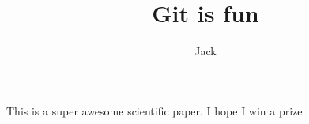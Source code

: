 \documentclass[10pt]{article}
\author{Jack}
\title{Git is fun}
\begin{document}
	\maketitle

	This is a super awesome scientific paper.
	I hope I win a prize
\end{document}

